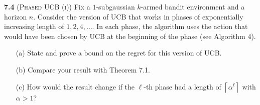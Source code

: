 




\noindent\textbf{7.4} (\textsc{Phased UCB (i)})
Fix a $1$-subgaussian $k$-armed bandit environment and a horizon $n$.
Consider the version of UCB that works in phases of exponentially increasing length of $1,2,4, \ldots$.
In each phase, the algorithm uses the action that would have been chosen by UCB at the beginning of the phase (see Algorithm 4).

\begin{enumerate}
    \item[(a)] State and prove a bound on the regret for this version of UCB.
    \item[(b)] Compare your result with Theorem 7.1.
    \item[(c)] How would the result change if the $\ell$-th phase had a length of $\left\lceil\alpha^{\ell}\right\rceil$ with $\alpha > 1$?
\end{enumerate}

